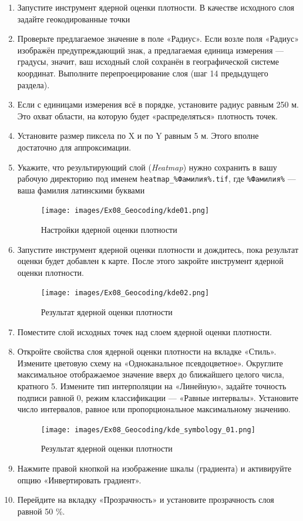 \documentclass[
  12pt,
]{book}
\begin{document}
\begin{enumerate}
\def\labelenumi{\arabic{enumi}.}
\item
  Запустите инструмент ядерной оценки плотности. В качестве исходного слоя задайте геокодированные точки
\item
  Проверьте предлагаемое значение в поле «Радиус». Если возле поля «Радиус» изображён предупреждающий знак, а предлагаемая единица измерения --- градусы, значит, ваш исходный слой сохранён в географической системе координат. Выполните перепроецирование слоя (шаг 14 предыдущего раздела).
\item
  Если с единицами измерения всё в порядке, установите радиус равным 250 м. Это охват области, на которую будет «распределяться» плотность точек.
\item
  Установите размер пиксела по X и по Y равным 5 м. Этого вполне достаточно для аппроксимации.
\item
  Укажите, что результирующий слой (\emph{Heatmap}) нужно сохранить в вашу рабочую директорию под именем \texttt{heatmap\_\%Фамилия\%.tif}, где \texttt{\%Фамилия\%} --- ваша фамилия латинскими буквами

  \begin{figure}
  \centering
  \texttt{[image: images/Ex08\_Geocoding/kde01.png]}
  \caption{Настройки ядерной оценки плотности}
  \end{figure}
\item
  Запустите инструмент ядерной оценки плотности и дождитесь, пока результат оценки будет добавлен к карте. После этого закройте инструмент ядерной оценки плотности.

  \begin{figure}
  \centering
  \texttt{[image: images/Ex08\_Geocoding/kde02.png]}
  \caption{Результат ядерной оценки плотности}
  \end{figure}
\item
  Поместите слой исходных точек над слоем ядерной оценки плотности.
\item
  Откройте свойства слоя ядерной оценки плотности на вкладке «Стиль». Измените цветовую схему на «Одноканальное псевдоцветное». Округлите максимальное отображаемое значение вверх до ближайшего целого числа, кратного 5. Измените тип интерполяции на «Линейную», задайте точность подписи равной 0, режим классификации --- «Равные интервалы». Установите число интервалов, равное или пропорциональное максимальному значению.

  \begin{figure}
  \centering
  \texttt{[image: images/Ex08\_Geocoding/kde\_symbology\_01.png]}
  \caption{Результат ядерной оценки плотности}
  \end{figure}
\item
  Нажмите правой кнопкой на изображение шкалы (градиента) и активируйте опцию «Инвертировать градиент».
\item
  Перейдите на вкладку «Прозрачность» и установите прозрачность слоя равной 50 \%.


\end{enumerate}
\end{document}
